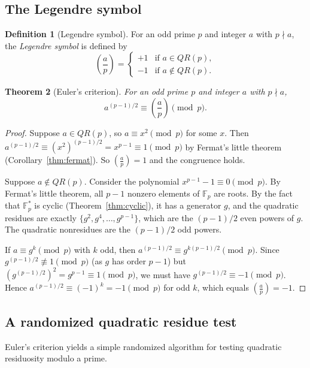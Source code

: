 \documentclass[twoside,12pt]{book}
\theoremstyle{plain}
\newtheorem{theorem}{Theorem}[chapter]
\theoremstyle{definition}
\newtheorem{definition}[theorem]{Definition}
\theoremstyle{remark}
\begin{document}
\subsection{The Legendre symbol}

\begin{definition}[Legendre symbol]
For an odd prime $p$ and integer $a$ with $p \nmid a$, the \emph{Legendre symbol} is defined by
\[
\left(\frac{a}{p}\right) = \begin{cases}
+1 & \text{if } a \in QR(p), \\
-1 & \text{if } a \notin QR(p).
\end{cases}
\]
\end{definition}

\begin{theorem}[Euler's criterion]
\label{thm:euler-criterion}
For an odd prime $p$ and integer $a$ with $p \nmid a$,
\[
a^{(p-1)/2} \equiv \left(\frac{a}{p}\right) \pmod{p}.
\]
\end{theorem}

\begin{proof}
Suppose $a \in QR(p)$, so $a \equiv x^2 \pmod{p}$ for some $x$. Then $a^{(p-1)/2} \equiv (x^2)^{(p-1)/2} = x^{p-1} \equiv 1 \pmod{p}$ by Fermat's little theorem (Corollary~\ref{thm:fermat}). So $\left(\frac{a}{p}\right) = 1$ and the congruence holds.

Suppose $a \notin QR(p)$. Consider the polynomial $x^{p-1} - 1 \equiv 0 \pmod{p}$. By Fermat's little theorem, all $p-1$ nonzero elements of $\mathbb{F}_p$ are roots. By the fact that $\mathbb{F}_p^*$ is cyclic (Theorem~\ref{thm:cyclic}), it has a generator $g$, and the quadratic residues are exactly $\{g^2, g^4, \ldots, g^{p-1}\}$, which are the $(p-1)/2$ even powers of $g$. The quadratic nonresidues are the $(p-1)/2$ odd powers.

If $a \equiv g^k \pmod{p}$ with $k$ odd, then $a^{(p-1)/2} \equiv g^{k(p-1)/2} \pmod{p}$. Since $g^{(p-1)/2} \not\equiv 1 \pmod{p}$ (as $g$ has order $p-1$) but $(g^{(p-1)/2})^2 = g^{p-1} \equiv 1 \pmod{p}$, we must have $g^{(p-1)/2} \equiv -1 \pmod{p}$. Hence $a^{(p-1)/2} \equiv (-1)^k = -1 \pmod{p}$ for odd $k$, which equals $\left(\frac{a}{p}\right) = -1$.
\end{proof}

\subsection{A randomized quadratic residue test}

Euler's criterion yields a simple randomized algorithm for testing quadratic residuosity modulo a prime.
\end{document}
